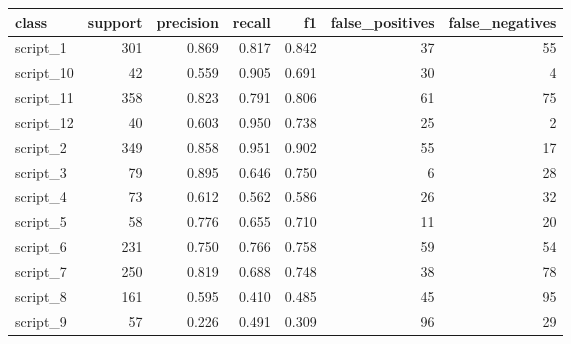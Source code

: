 \begin{tabular}{lrrrrrr}
\toprule
class & support & precision & recall & f1 & false_positives & false_negatives \\
\midrule
script_1 & 301 & 0.869 & 0.817 & 0.842 & 37 & 55 \\
script_10 & 42 & 0.559 & 0.905 & 0.691 & 30 & 4 \\
script_11 & 358 & 0.823 & 0.791 & 0.806 & 61 & 75 \\
script_12 & 40 & 0.603 & 0.950 & 0.738 & 25 & 2 \\
script_2 & 349 & 0.858 & 0.951 & 0.902 & 55 & 17 \\
script_3 & 79 & 0.895 & 0.646 & 0.750 & 6 & 28 \\
script_4 & 73 & 0.612 & 0.562 & 0.586 & 26 & 32 \\
script_5 & 58 & 0.776 & 0.655 & 0.710 & 11 & 20 \\
script_6 & 231 & 0.750 & 0.766 & 0.758 & 59 & 54 \\
script_7 & 250 & 0.819 & 0.688 & 0.748 & 38 & 78 \\
script_8 & 161 & 0.595 & 0.410 & 0.485 & 45 & 95 \\
script_9 & 57 & 0.226 & 0.491 & 0.309 & 96 & 29 \\
\bottomrule
\end{tabular}
